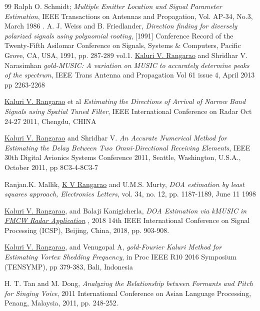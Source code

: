 \begin{thebibliography}{99}
Ralph O. Schmidt;
{\em Multiple Emitter Location and Signal Parameter Estimation},
IEEE Transactions on Antennas and Propagation, Vol. AP-34, No.3, March 1986
.
A. J. Weiss and B. Friedlander, 
{\em Direction finding for diversely polarized signals using polynomial rooting}, [1991] Conference Record of the Twenty-Fifth Asilomar Conference on Signals, Systems \& Computers, Pacific Grove, CA, USA, 1991, pp. 287-289 vol.1. 	
{\href{http://ieeexplore.ieee.org/document/6376104/}
	{Kaluri V. Rangarao} and Shridhar V. Narasimhan {\em gold-MUSIC: A variation on MUSIC to accurately determine peaks of the spectrum}, IEEE Trans Antenna and Propagation Vol 61 issue 4, April 2013 pp 2263-2268}

{\href{http://ieeexplore.ieee.org/document/6159541/}
	{Kaluri V. Rangarao} et al {\em Estimating the Directions of Arrival of Narrow Band Signals using Spatial Tuned Filter}, IEEE International Conference on Radar Oct 24-27 2011, Chengdu, CHINA}

{\href{http://ieeexplore.ieee.org/document/6096146/}
	{Kaluri V. Rangarao} and Shridhar V. {\em An Accurate Numerical Method for Estimating the Delay Between Two Omni-Directional Receiving Elements}, IEEE 30th Digital Avionics Systems Conference 2011, Seattle, Washington, U.S.A., October 2011, pp 8C3-4-8C3-7}

{Ranjan.K. Mallik, 	\href{http://ieeexplore.ieee.org/document/702362/}{K V Rangarao}
and U.M.S. Murty, {\em DOA estimation by least squares approach, Electronics Letters}, 
vol. 34, no. 12, pp. 1187-1189, June 11 1998}


{\href{https://ieeexplore.ieee.org/document/8652394}
	{Kaluri V. Rangarao},  
	and Balaji Kanigicherla, {\em DOA Estimation via kMUSIC in 
		\href{https://events.vtools.ieee.org/m/175360}		{FMCW Radar Application}
	}, 2018 14th IEEE International Conference on Signal Processing (ICSP), Beijing, China, 2018, pp. 903-908.}


{\href{http://ieeexplore.ieee.org/document/7519436/}
	{Kaluri V. Rangarao},  and Venugopal A, {\em gold-Fourier Kaluri Method for Estimating Vortex Shedding Frequency}, in Proc IEEE R10 2016 Symposium (TENSYMP), pp 379-383, Bali, Indonesia}
	
	
H. T. Tan and M. Dong, 
{\em Analyzing the Relationship between Formants and Pitch for Singing Voice}, 
2011 International Conference on Asian Language Processing, Penang, Malaysia, 2011, pp. 248-252.


\end{thebibliography}
